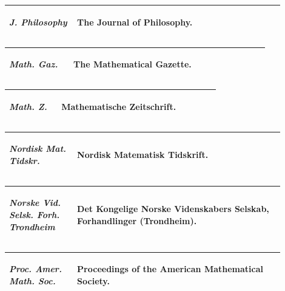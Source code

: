 \documentclass[11pt,reqno]{amsart}
\theoremstyle{blueplain}
\numberwithin{equation}{section}
\def\hyperlink#1#2{#2}}
\begin{document}
\par\setlength{\parskip}{0pt}\nointerlineskip
\noindent
\begin{tabular}{|@{}p{0.22500\linewidth}|p{0.67500\linewidth}|}\hline
\hypertarget{abbr:journal-J-Philosophy}{}\hyperlink{abbr-source:Tait1981}{\emph{J. Philosophy}} & The Journal of Philosophy.\\\hline
\end{tabular}%
\par\setlength{\parskip}{0pt}\nointerlineskip
\noindent
\begin{tabular}{|@{}p{0.22500\linewidth}|p{0.67500\linewidth}|}\hline
\hypertarget{abbr:journal-Math-Gaz}{}\hyperlink{abbr-source:Willans1964}{\emph{Math. Gaz.}} & The Mathematical Gazette.\\\hline
\end{tabular}%
\par\setlength{\parskip}{0pt}\nointerlineskip
\noindent
\begin{tabular}{|@{}p{0.22500\linewidth}|p{0.67500\linewidth}|}\hline
\hypertarget{abbr:journal-Math-Z}{}\hyperlink{abbr-source:ThornerZaman2024}{\emph{Math. Z.}} & Mathematische Zeitschrift.\\\hline
\end{tabular}%
\par\setlength{\parskip}{0pt}\nointerlineskip
\noindent
\begin{tabular}{|@{}p{0.22500\linewidth}|p{0.67500\linewidth}|}\hline
\hypertarget{abbr:journal-Nordisk-Mat-Tidskr}{}\hyperlink{abbr-source:Bang1952}{\emph{Nordisk Mat. Tidskr.}} & Nordisk Matematisk Tidskrift.\\\hline
\end{tabular}%
\par\setlength{\parskip}{0pt}\nointerlineskip
\noindent
\begin{tabular}{|@{}p{0.22500\linewidth}|p{0.67500\linewidth}|}\hline
\hypertarget{abbr:journal-Norske-Vid-Selsk-Forh-Trondheim}{}\hyperlink{abbr-source:Srinivasan1962}{\emph{Norske Vid. Selsk. Forh. Trondheim}} & Det Kongelige Norske Videnskabers Selskab, Forhandlinger (Trondheim).\\\hline
\end{tabular}%
\par\setlength{\parskip}{0pt}\nointerlineskip
\noindent
\begin{tabular}{|@{}p{0.22500\linewidth}|p{0.67500\linewidth}|}\hline
\hypertarget{abbr:journal-Proc-Amer-Math-Soc}{}\hyperlink{abbr-source:Ore1952}{\emph{Proc. Amer. Math. Soc.}} & Proceedings of the American Mathematical Society.\\\hline
\end{tabular}%
\end{document}
